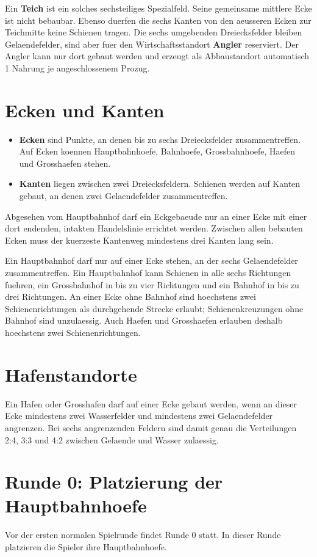 \documentclass[11pt,a4paper,oneside,parskip=half]{scrreprt}
\newcommand{\begriff}[1]{\textbf{#1}}
\begin{document}
Ein \begriff{Teich} ist ein solches sechsteiliges Spezialfeld. Seine gemeinsame
mittlere Ecke ist nicht bebaubar. Ebenso duerfen die sechs Kanten von den
aeusseren Ecken zur Teichmitte keine Schienen tragen. Die sechs umgebenden
Dreiecksfelder bleiben Gelaendefelder, sind aber fuer den Wirtschaftsstandort
\begriff{Angler} reserviert. Der Angler kann nur dort gebaut werden und erzeugt
als Abbaustandort automatisch 1 Nahrung je angeschlossenem Prozug.

\section{Ecken und Kanten}
\begin{itemize}
  \item \begriff{Ecken} sind Punkte, an denen bis zu sechs Dreiecksfelder zusammentreffen. Auf Ecken koennen Hauptbahnhoefe, Bahnhoefe, Grossbahnhoefe, Haefen und Grosshaefen stehen.
  \item \begriff{Kanten} liegen zwischen zwei Dreiecksfeldern. Schienen werden auf Kanten gebaut, an denen zwei Gelaendefelder zusammentreffen.
\end{itemize}

Abgesehen vom Hauptbahnhof darf ein Eckgebaeude nur an einer Ecke mit einer dort
endenden, intakten Handelslinie errichtet werden. Zwischen allen bebauten Ecken
muss der kuerzeste Kantenweg mindestens drei Kanten lang sein.

Ein Hauptbahnhof darf nur auf einer Ecke stehen, an der sechs Gelaendefelder
zusammentreffen. Ein Hauptbahnhof kann Schienen in alle sechs Richtungen fuehren,
ein Grossbahnhof in bis zu vier Richtungen und ein Bahnhof in bis zu drei
Richtungen. An einer Ecke ohne Bahnhof sind hoechstens zwei Schienenrichtungen
als durchgehende Strecke erlaubt; Schienenkreuzungen ohne Bahnhof sind unzulaessig.
Auch Haefen und Grosshaefen erlauben deshalb hoechstens zwei Schienenrichtungen.

\section{Hafenstandorte}
Ein Hafen oder Grosshafen darf auf einer Ecke gebaut werden, wenn an dieser Ecke
mindestens zwei Wasserfelder und mindestens zwei Gelaendefelder angrenzen. Bei
sechs angrenzenden Feldern sind damit genau die Verteilungen 2:4, 3:3 und 4:2
zwischen Gelaende und Wasser zulaessig.

\section{Runde 0: Platzierung der Hauptbahnhoefe}
Vor der ersten normalen Spielrunde findet Runde 0 statt. In dieser Runde platzieren die Spieler ihre Hauptbahnhoefe.
\end{document}
